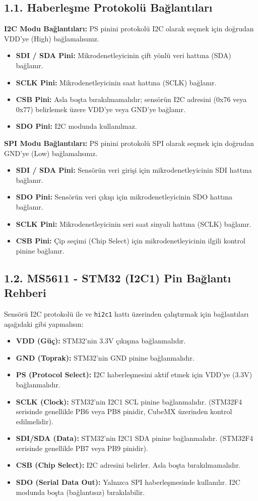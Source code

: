 \documentclass[12pt, a4paper]{article}
\begin{document}
\subsection*{1.1. Haberleşme Protokolü Bağlantıları}
\textbf{I2C Modu Bağlantıları:} PS pinini protokolü I2C olarak seçmek için doğrudan VDD'ye (High) bağlamalısınız.
\begin{itemize}
\item \textbf{SDI / SDA Pini:} Mikrodenetleyicinin çift yönlü veri hattına (SDA) bağlanır.
\item \textbf{SCLK Pini:} Mikrodenetleyicinin saat hattına (SCLK) bağlanır.
\item \textbf{CSB Pini:} Asla boşta bırakılmamalıdır; sensörün I2C adresini (0x76 veya 0x77) belirlemek üzere VDD'ye veya GND'ye bağlanır.
\item \textbf{SDO Pini:} I2C modunda kullanılmaz.
\end{itemize}

\vspace{0.3cm}
\textbf{SPI Modu Bağlantıları:} PS pinini protokolü SPI olarak seçmek için doğrudan GND'ye (Low) bağlamalısınız.
\begin{itemize}
\item \textbf{SDI / SDA Pini:} Sensörün veri girişi için mikrodenetleyicinin SDI hattına bağlanır.
\item \textbf{SDO Pini:} Sensörün veri çıkışı için mikrodenetleyicinin SDO hattına bağlanır.
\item \textbf{SCLK Pini:} Mikrodenetleyicinin seri saat sinyali hattına (SCLK) bağlanır.
\item \textbf{CSB Pini:} Çip seçimi (Chip Select) için mikrodenetleyicinin ilgili kontrol pinine bağlanır.
\end{itemize}

\subsection*{1.2. MS5611 - STM32 (I2C1) Pin Bağlantı Rehberi}
Sensörü I2C protokolü ile ve \texttt{hi2c1} hattı üzerinden çalıştırmak için bağlantıları aşağıdaki gibi yapmalısın:
\begin{itemize}
\item \textbf{VDD (Güç):} STM32'nin 3.3V çıkışına bağlanmalıdır.
\item \textbf{GND (Toprak):} STM32'nin GND pinine bağlanmalıdır.
\item \textbf{PS (Protocol Select):} I2C haberleşmesini aktif etmek için VDD'ye (3.3V) bağlanmalıdır.
\item \textbf{SCLK (Clock):} STM32'nin I2C1 SCL pinine bağlanmalıdır. (STM32F4 serisinde genellikle PB6 veya PB8 pinidir, CubeMX üzerinden kontrol edilmelidir).
\item \textbf{SDI/SDA (Data):} STM32'nin I2C1 SDA pinine bağlanmalıdır. (STM32F4 serisinde genellikle PB7 veya PB9 pinidir).
\item \textbf{CSB (Chip Select):} I2C adresini belirler. Asla boşta bırakılmamalıdır.
\item \textbf{SDO (Serial Data Out):} Yalnızca SPI haberleşmesinde kullanılır. I2C modunda boşta (bağlantısız) bırakılabilir.
\end{itemize}
\end{document}
